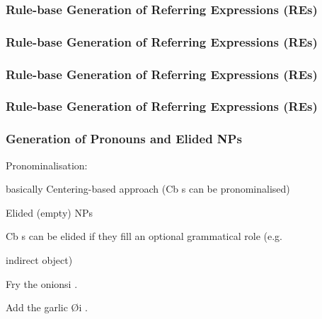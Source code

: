 \documentclass[compress,color=usenames]{beamer}
\begin{document}
\begin{frame}
\frametitle{
Rule-base Generation of Referring Expressions (REs)}










\end{frame}
\begin{frame}
\frametitle{
Rule-base Generation of Referring Expressions (REs)}










\end{frame}
\begin{frame}
\frametitle{
Rule-base Generation of Referring Expressions (REs)}










\end{frame}
\begin{frame}
\frametitle{
Rule-base Generation of Referring Expressions (REs)}










\end{frame}
\begin{frame}
\frametitle{
Generation of Pronouns and Elided NPs}






Pronominalisation:



basically Centering-based approach (Cb s can be pronominalised)



Elided (empty) NPs



Cb s can be elided if they ﬁll an optional grammatical role (e.g.



indirect object)



Fry the onionsi .



Add the garlic {\O}i .










\end{frame}
\end{document}
